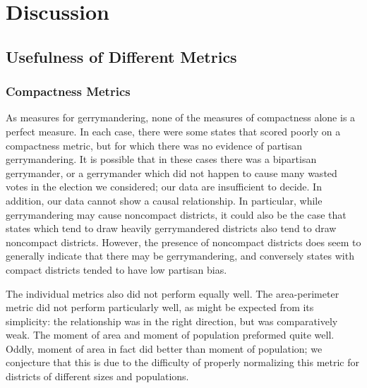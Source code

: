 \documentclass[12pt]{article}
\begin{document}
  \section{Discussion}\label{s:discussion}
  \subsection{Usefulness of Different Metrics}
  \subsubsection{Compactness Metrics}
  As measures for gerrymandering, none of the measures of compactness alone is a perfect measure.  In each case, there were some states that scored poorly on a compactness metric, but for which there was no evidence of partisan gerrymandering.  It is possible that in these cases there was a bipartisan gerrymander, or a gerrymander which did not happen to cause many wasted votes in the election we considered; our data are insufficient to decide.  In addition, our data cannot show a causal relationship.  In particular, while gerrymandering may cause noncompact districts, it could also be the case that states which tend to draw heavily gerrymandered districts also tend to draw noncompact districts.  However, the presence of noncompact districts does seem to generally indicate that there may be gerrymandering, and conversely states with compact districts tended to have low partisan bias.

  The individual metrics also did not perform equally well.  The area-perimeter metric did not perform particularly well, as might be expected from its simplicity: the relationship was in the right direction, but was comparatively weak.  The moment of area and moment of population preformed quite well.  Oddly, moment of area in fact did better than moment of population; we conjecture that this is due to the difficulty of properly normalizing this metric for districts of different sizes and populations.
\end{document}
